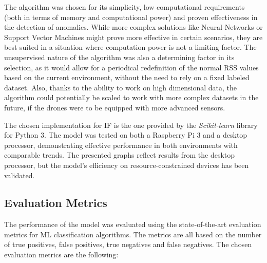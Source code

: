 \documentclass[futureinternet,article,submit,pdftex,moreauthors]{Definitions/mdpi}
\begin{document}
The algorithm was chosen for its simplicity, low computational requirements (both in terms of memory and computational power) and proven effectiveness in the detection of anomalies\cite{IsolationForestLiu}. While more complex solutions like Neural Networks or Support Vector Machines might prove more effective in certain scenarios, they are best suited in a situation where computation power is not a limiting factor.
The unsupervised nature of the algorithm was also a determining factor in its selection, as it would allow for a periodical redefinition of the normal RSS values based on the current environment, without the need to rely on a fixed labeled dataset. 
Also, thanks to the ability to work on high dimensional data, the algorithm could potentially be scaled to work with more complex datasets in the future, if the drones were to be equipped with more advanced sensors.

The chosen implementation for IF is the one provided by the \textit{Scikit-learn} library \cite{IsolationForestScikitLearn} for Python 3. The model was tested on both a Raspberry Pi 3 and a desktop processor, demonstrating effective performance in both environments with comparable trends. The presented graphs reflect results from the desktop processor, but the model's efficiency on resource-constrained devices has been validated.

\subsection{Evaluation Metrics}\label{EvaluationMetrics}

The performance of the model was evaluated using the state-of-the-art evaluation metrics for ML classification algorithms. The metrics are all based on the number of true positives, false positives, true negatives and false negatives.
The chosen evaluation metrics are the following: 
\end{document}
